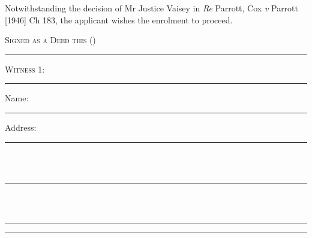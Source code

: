 \documentclass[10pt, twoside, a4paper]{article}
\begin{document}
\vspace{10pt}

\noindent Notwithstanding the decision of Mr Justice Vaisey in \textit{Re} Parrott, Cox
\textit{v} Parrott [1946] Ch 183, the applicant wishes the enrolment to proceed.

\vspace{24pt}

{
	\scshape
	\noindent Signed as a Deed this \worddate  \space (\numberdate)
}

\vspace{48pt}

\begin{multicols}{2}

	\par\noindent\hrule
	\vspace{14pt}

	{
		\centering
		\noindent
		\textbf{\scshape{\newname}}
		\par
	}

	\vspace{45pt}

	{\scshape \noindent Witness 1:}

	\vspace{48pt}
	\par\noindent\hrule
	\vspace{14pt}

	{
		\scshape

		\noindent Name: \\
		\noindent\hspace*{4em}\rule{0.35\textwidth}{0.5pt}

		\vspace{12pt}

		\noindent Address:

		\noindent\hspace*{4em}\rule{0.35\textwidth}{0.5pt} \\ \\
		\noindent\hspace*{4em}\rule{0.35\textwidth}{0.5pt} \\ \\
		\noindent\hspace*{4em}\rule{0.35\textwidth}{0.5pt}
	}

	\columnbreak

	\par\noindent\hrule
	\vspace{14pt}

	{
		\centering
		\noindent
        \textbf{\scshape{\oldname}}
		\par
	}


\end{multicols}
\end{document}
